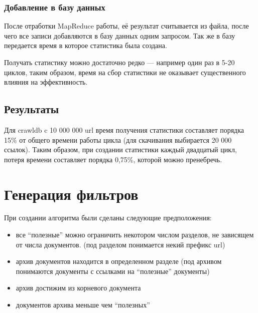 \subsubsection{Добавление в базу данных}
После отработки MapReduce работы, её результат считывается из файла, после чего все записи добавляются в базу данных одним запросом. Так же в базу передается время в которое статистика была создана.

Получать статистику можно достаточно редко --- например один раз в 5-20 циклов, таким образом, время на сбор статистики не оказывает существенного влияния на эффективность.
\subsection{Результаты}
Для crawldb c 10 000 000 url время получения статистики составляет порядка 15\% от общего времени работы цикла (для скачивания выбирается 20 000 ссылок). Таким образом, при создании статистики каждый двадцатый цикл, потеря времени составляет порядка 0,75\%, которой  можно пренебречь.

\section{Генерация фильтров}
При создании алгоритма были сделаны следующие предположения:
\begin{itemize}
 \item все ``полезные'' можно ограничить некотором числом разделов, не зависящем от числа документов. (под разделом понимается некий префикс url)
 \item архив документов находится в определенном разделе (под архивом понимаются документы с ссылками на ``полезные'' документы)
 \item архив достижим из корневого документа
 \item документов архива меньше чем ``полезных''
\end{itemize}

